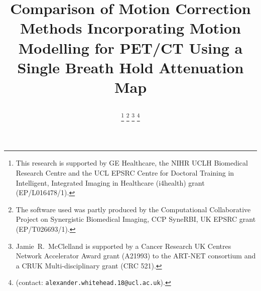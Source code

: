 \documentclass[10pt, twocolumn, twoside, letterpaper]{IEEEtran}
\begin{document}
\title{

    Comparison of Motion Correction Methods Incorporating Motion Modelling for PET/CT Using a Single Breath Hold Attenuation Map
}

\pagestyle{plain}

\author{
    
        
    
            

    \thanks{This research is supported by GE Healthcare, the NIHR UCLH Biomedical Research Centre and the UCL EPSRC Centre for Doctoral Training in Intelligent, Integrated Imaging in Healthcare (i4health) grant (EP/L016478/1).}
    \thanks{The software used was partly produced by the Computational Collaborative Project on Synergistic Biomedical Imaging, CCP SyneRBI, UK EPSRC grant (EP/T026693/1).}
    \thanks{Jamie~R.~McClelland is supported by a Cancer Research UK Centres Network Accelerator Award grant (A21993) to the ART-NET consortium and a CRUK Multi-disciplinary grant (CRC 521).}
    \thanks{(contact: \texttt{alexander.whitehead.18@ucl.ac.uk}).}
}
\end{document}
